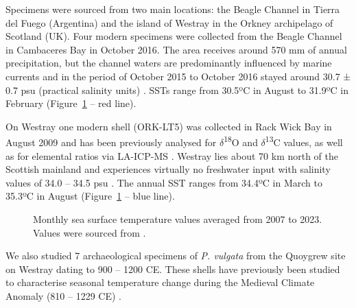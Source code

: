 \documentclass[
  authoryear,
  preprint,
  3p]{elsarticle}
\begin{document}
Specimens were sourced from two main locations: the Beagle Channel in
Tierra del Fuego (Argentina) and the island of Westray in the Orkney
archipelago of Scotland (UK). Four modern specimens were collected from
the Beagle Channel in Cambaceres Bay in October 2016. The area receives
around 570 mm of annual precipitation, but the channel waters are
predominantly influenced by marine currents and in the period of October
2015 to October 2016 stayed around 30.7 ± 0.7 psu (practical salinity
units) \citep{Nicastro2020-ih}. SSTs range from 30.5ºC in August to
31.9ºC in February (Figure~\ref{fig-SSTs} -- red line).

On Westray one modern shell (ORK-LT5) was collected in Rack Wick Bay in
August 2009 and has been previously analysed for
\(\delta\)\textsuperscript{18}O and \(\delta\)\textsuperscript{13}C
values, as well as for elemental ratios via LA-ICP-MS
\citep{Graniero2017-io}. Westray lies about 70 km north of the Scottish
mainland and experiences virtually no freshwater input with salinity
values of 34.0 -- 34.5 psu \citep{Inall2009-ho}. The annual SST ranges
from 34.4ºC in March to 35.3ºC in August (Figure~\ref{fig-SSTs} -- blue
line).

\begin{figure}[H]


\caption{\label{fig-SSTs}Monthly sea surface temperature values averaged
from 2007 to 2023. Values were sourced from \citet{Good2020-nl}.}

\end{figure}%

We also studied 7 archaeological specimens of \emph{P. vulgata} from the
Quoygrew site on Westray dating to 900 -- 1200 CE. These shells have
previously been studied to characterise seasonal temperature change
during the Medieval Climate Anomaly (810 -- 1229 CE)
\citep{Surge2012-ba}.
\end{document}
